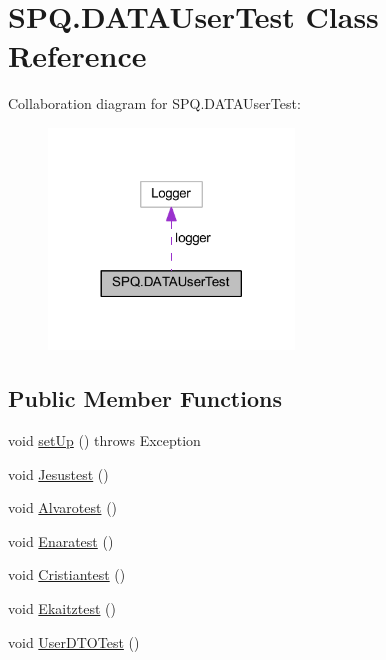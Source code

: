 \hypertarget{class_s_p_q_1_1_d_a_t_a_user_test}{}\section{S\+P\+Q.\+D\+A\+T\+A\+User\+Test Class Reference}
\label{class_s_p_q_1_1_d_a_t_a_user_test}


Collaboration diagram for S\+P\+Q.\+D\+A\+T\+A\+User\+Test\+:\nopagebreak
\begin{figure}[H]
\begin{center}
\leavevmode
\includegraphics[width=185pt]{class_s_p_q_1_1_d_a_t_a_user_test__coll__graph}
\end{center}
\end{figure}
\subsection*{Public Member Functions}
\begin{DoxyCompactItemize}
\item 
void \mbox{\hyperlink{class_s_p_q_1_1_d_a_t_a_user_test_a703753b88018d83f5a2d3b76d335889a}{set\+Up}} ()  throws Exception 
\item 
void \mbox{\hyperlink{class_s_p_q_1_1_d_a_t_a_user_test_a29a15c9122a588e854a02c6c2fe1d203}{Jesustest}} ()
\item 
void \mbox{\hyperlink{class_s_p_q_1_1_d_a_t_a_user_test_a9d47696cb1887a6d5712f0e9beae2182}{Alvarotest}} ()
\item 
void \mbox{\hyperlink{class_s_p_q_1_1_d_a_t_a_user_test_a84d1c3d3992383e1cb93d07241cf3f02}{Enaratest}} ()
\item 
void \mbox{\hyperlink{class_s_p_q_1_1_d_a_t_a_user_test_a7defc94d9391e6721dee5c627f75e1fb}{Cristiantest}} ()
\item 
void \mbox{\hyperlink{class_s_p_q_1_1_d_a_t_a_user_test_a04242b7156b6bb7828bd569de8027fad}{Ekaitztest}} ()
\item 
void \mbox{\hyperlink{class_s_p_q_1_1_d_a_t_a_user_test_a4feb113d2b2971c37851e1b6bddca741}{User\+D\+T\+O\+Test}} ()
\end{DoxyCompactItemize}


